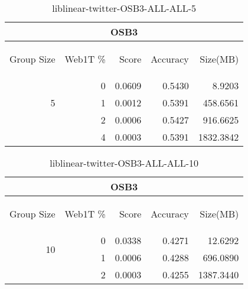 \begin{center}
\begin{table}[htbp] 
 \begin{center}
\begin{tabular}{ | r | r | r | r | r |}
\hline
\multicolumn{5}{|c|}{OSB3}\\
\hline
\begin{sideways}Group Size\end{sideways} & \begin{sideways}Web1T \%\end{sideways} & \begin{sideways}Score\end{sideways} & \begin{sideways}Accuracy\end{sideways} & \begin{sideways}Size(MB)\end{sideways}\\
\hline
\multirow{3}{*}{5}
 & 0 & 0.0609 & 0.5430 & 8.9203\\ \cline{2-5}
 & 1 & 0.0012 & 0.5391 & 458.6561\\ \cline{2-5}
 & 2 & 0.0006 & 0.5427 & 916.6625\\ \cline{2-5}
 & 4 & 0.0003 & 0.5391 & 1832.3842\\ \cline{2-5}
\hline
\end{tabular}
\caption{liblinear-twitter-OSB3-ALL-ALL-5}
\label{table:liblinear-twitter-OSB3-ALL-ALL-5}
\end{center}
 \end{table}
\end{center}

\begin{center}
\begin{table}[htbp] 
 \begin{center}
\begin{tabular}{ | r | r | r | r | r |}
\hline
\multicolumn{5}{|c|}{OSB3}\\
\hline
\begin{sideways}Group Size\end{sideways} & \begin{sideways}Web1T \%\end{sideways} & \begin{sideways}Score\end{sideways} & \begin{sideways}Accuracy\end{sideways} & \begin{sideways}Size(MB)\end{sideways}\\
\hline
\multirow{2}{*}{10}
 & 0 & 0.0338 & 0.4271 & 12.6292\\ \cline{2-5}
 & 1 & 0.0006 & 0.4288 & 696.0890\\ \cline{2-5}
 & 2 & 0.0003 & 0.4255 & 1387.3440\\ \cline{2-5}
\hline
\end{tabular}
\caption{liblinear-twitter-OSB3-ALL-ALL-10}
\label{table:liblinear-twitter-OSB3-ALL-ALL-10}
\end{center}
 \end{table}
\end{center}

